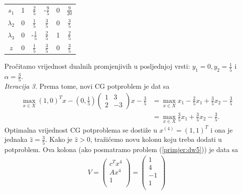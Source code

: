 \documentclass[a4paper, utf8, 11pt, colorlinks]{book}
\begin{document}
\begin{center}
	
	\begin{tabular}{c|cccc|c}
		$s_1$	    &   1      &    $\frac{2}{5}$          &   -$\frac{9}{5}$       &   0          &  $\frac{9}{20}$ \\
		$\lambda_2$  &   0      &    $\frac{1}{5}$         &   $\frac{3}{5}$        &   0          &  $\frac{3}{5}$             \\
		$\lambda_3$  &   0      &    -$\frac{1}{5}$        &   $\frac{2}{5}$        &   1          &  $\frac{2}{5}$            \\ \hline
		$z$          &   0      &    $\frac{1}{5}$         &  $ \frac{3}{5}$        &   0           & $\frac{3}{5}$
	\end{tabular}
	
\end{center} 
  Pročitamo vrijednost dualnih promjenjivih u posljednjoj vrsti: $y_1 =0, y_2=\frac{1}{5}$ i $\alpha=\frac{3}{5}$.\\ \emph{Iteracija 3.} Prema tome, novi CG potproblem je dat sa 
  \begin{align*}
        \max_{x \in X} (1, 0)^T x - (0, \frac{1}{5})\left(\begin{array}{cc}
       	1 & 3 \\
       	2 & -3
       \end{array}\right)  x   - \frac{3}{5} &= \max_{x \in X}x_1  - \frac{2}{5}x_1 + \frac{3}{5}x_2 - \frac{3}{5} \\
       &= \max_{x \in X} \frac{3}{5}x_1 + \frac{3}{5}x_2 - \frac{3}{5}.
  \end{align*} 
Optimalna vrijednost CG potproblema se dostiže u $x^{(4)} = (1, 1)^T$ i ona je jednaka $\hat{z}=\frac{3}{5}$. Kako je $\hat{z}>0$, tražićemo novu kolonu koju treba dodati u potproblem. Ova kolona (ako posmatramo problem (\ref{primjer:dw5})) je   data sa 
\begin{align}
	V =   \begin{pmatrix}
		c^T x^4\\
		A x^4  \\
		1     \\
	\end{pmatrix} = \begin{pmatrix}
		1 \\
		4  \\
		-1  \\
		1\\  
	\end{pmatrix}
\end{align}
\end{document}
